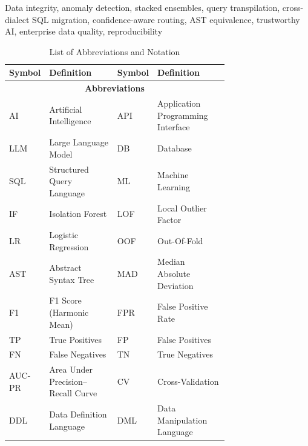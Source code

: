 \documentclass{ieeeaccess}
\begin{document}
\begin{keywords}
Data integrity, anomaly detection, stacked ensembles, query transpilation,
cross-dialect SQL migration, confidence-aware routing, AST equivalence,
trustworthy AI, enterprise data quality, reproducibility
\end{keywords}

\titlepgskip=-15pt
\maketitle

\begin{table}[tp]
\centering
\caption{List of Abbreviations and Notation}
\label{tab:abbreviations}
\footnotesize
\setlength{\tabcolsep}{4pt}
\renewcommand{\arraystretch}{1.05}
\begin{tabular}{|l|p{0.36\linewidth}||l|p{0.36\linewidth}|}
\hline
\textbf{Symbol} & \textbf{Definition} & \textbf{Symbol} & \textbf{Definition} \\
\hline
\multicolumn{4}{|c|}{\textbf{Abbreviations}} \\
\hline
AI    & Artificial Intelligence              & API  & Application Programming Interface \\ \hline
LLM   & Large Language Model                 & DB   & Database \\ \hline
SQL   & Structured Query Language            & ML   & Machine Learning \\ \hline
IF    & Isolation Forest                     & LOF  & Local Outlier Factor \\ \hline
LR    & Logistic Regression                  & OOF  & Out-Of-Fold \\ \hline
AST   & Abstract Syntax Tree                 & MAD  & Median Absolute Deviation \\ \hline
F1    & F1 Score (Harmonic Mean)             & FPR  & False Positive Rate \\ \hline
TP    & True Positives                       & FP   & False Positives \\ \hline
FN    & False Negatives                      & TN   & True Negatives \\ \hline
AUC-PR & Area Under Precision--Recall Curve  & CV   & Cross-Validation \\ \hline
DDL   & Data Definition Language             & DML  & Data Manipulation Language \\ \hline

\end{tabular}
\end{table}
\end{document}
